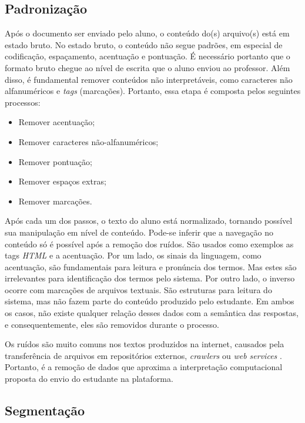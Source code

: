 \subsection{Padronização}
\label{subsec-padronizacao}


Após o documento ser enviado pelo aluno, o conteúdo do(s) arquivo(s) está em estado bruto. No estado bruto, o conteúdo não segue padrões, em especial de codificação, espaçamento, acentuação e pontuação. É necessário portanto que o formato bruto chegue ao nível de escrita que o aluno enviou ao professor. Além disso, é fundamental remover conteúdos não interpretáveis, como caracteres não alfanuméricos e \textit{tags} (marcações). Portanto, essa etapa é composta pelos seguintes processos:

\begin{itemize}
	\item Remover acentuação;
	\item Remover caracteres não-alfanuméricos;
	\item Remover pontuação;
	\item Remover espaços extras;
	\item Remover marcações.
\end{itemize}

Após cada um dos passos, o texto do aluno está normalizado, tornando possível sua manipulação em nível de conteúdo. Pode-se inferir que a navegação no conteúdo só é possível após a remoção dos ruídos. São usados como exemplos as tags \textit{HTML} e a acentuação. Por um lado, os sinais da linguagem, como acentuação, são fundamentais para leitura e pronúncia dos termos. Mas estes são irrelevantes para identificação dos termos pelo sistema. Por outro lado, o inverso ocorre com marcações de arquivos textuais. São estruturas para leitura do sistema, mas não fazem parte do conteúdo produzido pelo estudante. Em ambos os casos, não existe qualquer relação desses dados com a semântica das respostas, e consequentemente, eles são removidos durante o processo. 

Os ruídos são muito comuns nos textos produzidos na internet, causados pela transferência de arquivos em repositórios externos, \textit{crawlers} ou \textit{web services} \cite{han2011}. Portanto, é a remoção de dados que aproxima a interpretação computacional proposta do envio do estudante na plataforma.

\subsection{Segmentação}
\label{subsec-segmentacao}

